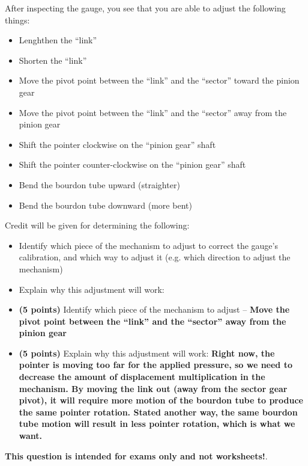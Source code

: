 \vskip 10pt

After inspecting the gauge, you see that you are able to adjust the following things:

\begin{itemize}
\item{} Lenghthen the ``link''
\item{} Shorten the ``link''
\item{} Move the pivot point between the ``link'' and the ``sector'' toward the pinion gear
\item{} Move the pivot point between the ``link'' and the ``sector'' away from the pinion gear
\item{} Shift the pointer clockwise on the ``pinion gear'' shaft
\item{} Shift the pointer counter-clockwise on the ``pinion gear'' shaft
\item{} Bend the bourdon tube upward (straighter)
\item{} Bend the bourdon tube downward (more bent)
\end{itemize}

\vskip 10pt

\noindent
Credit will be given for determining the following:

\begin{itemize}
\item{} Identify which piece of the mechanism to adjust to correct the gauge's calibration, and which way to adjust it (e.g. which direction to adjust the mechanism)
\vskip 5pt
\item{} Explain why this adjustment will work:
\end{itemize}







\begin{itemize}
\item{} {\bf (5 points)} Identify which piece of the mechanism to adjust -- {\bf Move the pivot point between the ``link'' and the ``sector'' away from the pinion gear}
\vskip 5pt
\item{} {\bf (5 points)} Explain why this adjustment will work: {\bf Right now, the pointer is moving too far for the applied pressure, so we need to decrease the amount of displacement multiplication in the mechanism.  By moving the link out (away from the sector gear pivot), it will require more motion of the bourdon tube to produce the same pointer rotation.  Stated another way, the same bourdon tube motion will result in less pointer rotation, which is what we want.}
\end{itemize}







{\bf This question is intended for exams only and not worksheets!}.



